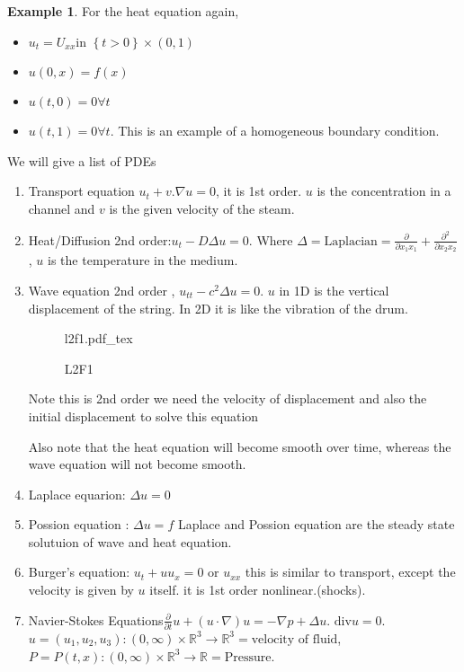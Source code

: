 \documentclass[a4paper]{article}
\newcommand{\incfig}[1]{%
	\def\svgwidth{\columnwidth}
	{#1.pdf_tex}
}
\theoremstyle{definition}
\newtheorem{example}{Example}
\begin{document}
\begin{example}
	For the heat equation again, 
	\begin{itemize}
		\item $u_t=U_{x x }$in $\left\{ t>0 \right\} \times \left( 0,1 \right) $
		\item $u\left( 0,x \right) =f\left( x \right) $
		\item $u\left( t,0 \right) =0 \forall t$
		\item $u\left( t,1 \right) =0 \forall t$. This is an example of a homogeneous boundary condition. 
	\end{itemize}
	We will give a list of PDEs 
	\begin{enumerate}
		\item Transport equation $u_t+v.\nabla u=0$, it is 1st order. $u$ is the concentration in a channel and $v$ is the given velocity of the steam. 
		\item Heat/Diffusion 2nd order:$u_t-D\Delta u=0$. Where $\Delta = \text{Laplacian}=\frac{\partial  }{\partial x_1x_1} +\frac{\partial ^2}{\partial x_2x_2} $, $u$ is the temperature in the medium. 
		\item Wave equation 2nd order , $u_{t t }-c^2\Delta u =0$. $u$ in 1D is the vertical displacement of the string. In 2D it is like the vibration of the drum.  
\begin{figure}[H]
    \centering
    \incfig{l2f1}
    \caption{L2F1}
    \label{fig:l2f1}
\end{figure}
Note this is 2nd order we need the velocity of displacement and also the initial displacement to solve this equation

Also note that the heat equation will become smooth over time, whereas the wave equation will not become smooth.
\item Laplace equarion: $\Delta u=0$
\item Possion equation : $\Delta u=f$ Laplace and Possion equation are the steady state solutuion of wave and heat equation. 
\item Burger's equation: $u_t +uu_x=0$ or $u_{x x }$ this is similar to transport, except the velocity is given by $u$ itself. it is 1st order nonlinear.(shocks). 
\item Navier-Stokes Equations$\frac{\partial }{\partial t } u+\left( u\cdot \nabla  \right) u=-\nabla p+\Delta u$. $\text{div}u=0$. $u=\left( u_1,u_2,u_3 \right) :\left( 0,\infty \right) \times \mathbb{R}^3\to \mathbb{R}^3=\text{velocity of fluid}$, $P=P\left( t,x \right) :\left( 0,\infty \right) \times \mathbb{R}^3\to \mathbb{R}=\text{Pressure}$. 
	\end{enumerate}


\end{example}
\end{document}
